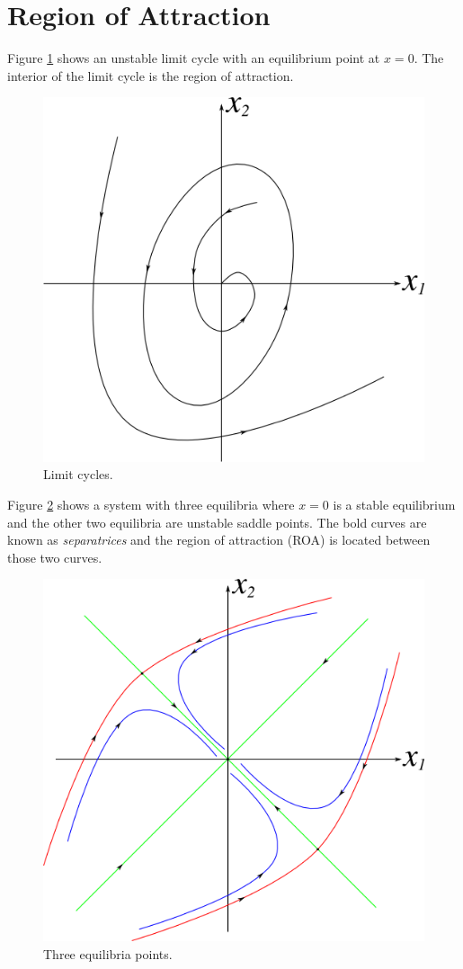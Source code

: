 \section{Region of Attraction}
Figure \ref{fig:09unstableLimitCycles} shows an unstable limit cycle with an equilibrium point at $x=0$. The interior of the limit cycle is the region of attraction.

\begin{figure}[ht!]
	\centering
	\includegraphics[width=.4\textwidth]{images/09unstableLimitCycles}
	\caption{Limit cycles.}
	\label{fig:09unstableLimitCycles}
\end{figure}

Figure \ref{fig:09threeEq} shows a system with three equilibria where $x=0$ is a stable equilibrium and the other two equilibria are unstable saddle points. The bold curves are known as \textit{separatrices} and the region of attraction (ROA) is located between those two curves.

\begin{figure}[ht!]
	\centering
	\includegraphics[width=.4\textwidth]{images/09threeEq}
	\caption{Three equilibria points.}
	\label{fig:09threeEq}
\end{figure}

